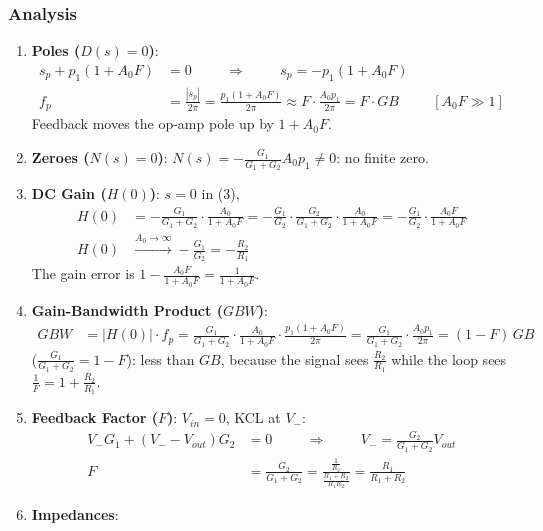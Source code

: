 \subsubsection{Analysis}
\begin{enumerate}
  \item \textbf{Poles (\(D(s) = 0\))}:
    \begin{align*}
      s_p + p_1(1 + A_0 F) &= 0 \hspace{1cm} \Rightarrow \hspace{1cm} s_p = -p_1(1 + A_0 F) \\
      f_p &= \frac{|s_p|}{2\pi} = \frac{p_1(1 + A_0 F)}{2\pi} \approx F \cdot \frac{A_0 p_1}{2\pi} = F \cdot GB \hspace{1cm} [A_0 F \gg 1]
    \end{align*}
    Feedback moves the op-amp pole up by \(1 + A_0 F\).
  \item \textbf{Zeroes (\(N(s) = 0\))}: \(N(s) = -\frac{G_1}{G_1 + G_2} A_0 p_1 \neq 0\): no finite zero.
  \item \textbf{DC Gain (\(H(0)\))}: \(s = 0\) in (3),
    \begin{align*}
      H(0) &= -\frac{G_1}{G_1 + G_2}\cdot\frac{A_0}{1 + A_0 F}
            = -\frac{G_1}{G_2}\cdot\frac{G_2}{G_1 + G_2}\cdot\frac{A_0}{1 + A_0 F} = -\frac{G_1}{G_2}\cdot\frac{A_0 F}{1 + A_0 F} \\
      H(0) &\xrightarrow{A_0 \to \infty} -\frac{G_1}{G_2} = -\frac{R_2}{R_1}
    \end{align*}
    The gain error is \(1 - \frac{A_0 F}{1 + A_0 F} = \frac{1}{1 + A_0 F}\).
  \item \textbf{Gain-Bandwidth Product (\(GBW\))}:
    \begin{align*}
      GBW &= |H(0)| \cdot f_p = \frac{G_1}{G_1 + G_2}\cdot\frac{A_0}{1 + A_0 F}\cdot\frac{p_1(1 + A_0 F)}{2\pi}
           = \frac{G_1}{G_1 + G_2}\cdot\frac{A_0 p_1}{2\pi} = (1 - F)\, GB
    \end{align*}
    (\(\frac{G_1}{G_1 + G_2} = 1 - F\)): less than \(GB\), because the signal sees \(\frac{R_2}{R_1}\) while
    the loop sees \(\frac{1}{F} = 1 + \frac{R_2}{R_1}\).
  \item \textbf{Feedback Factor (\(F\))}: \(V_{in} = 0\), KCL at \(V_-\):
    \begin{align*}
      V_- G_1 + (V_- - V_{out}) G_2 &= 0 \hspace{1cm} \Rightarrow \hspace{1cm} V_- = \frac{G_2}{G_1 + G_2} V_{out} \\
      F &= \frac{G_2}{G_1 + G_2} = \frac{\frac{1}{R_2}}{\frac{R_1 + R_2}{R_1 R_2}} = \frac{R_1}{R_1 + R_2}
    \end{align*}
  \item \textbf{Impedances}:

\end{enumerate}
